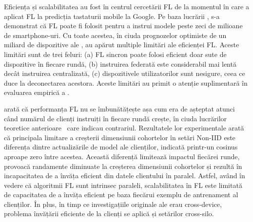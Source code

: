 Eficiența și scalabilitatea au fost în centrul cercetării FL de la momentul în care \citet{GoogleKeyboard} a aplicat FL la predicția tastaturii mobile la Google. Pe baza lucrării \citet{GoogleKeyboard}, \citet{ScaleSystemDesign} s-a demonstrat că FL poate fi folosit pentru a instrui modele peste zeci de milioane de smartphone-uri. Cu toate acestea, în ciuda prognozelor optimiste de un miliard de dispozitive ale \citet{ScaleSystemDesign}, au apărut multiple limitări ale eficienței FL. Aceste limitări sunt de trei feluri: (a) FL sincron poate folosi eficient doar sute de dispozitive în fiecare rundă, (b) instruirea federată este considerabil mai lentă decât instruirea centralizată, (c) dispozitivele utilizatorilor sunt nesigure, ceea ce duce la deconectarea acestora. Aceste limitări au primit o atenție suplimentară în evaluarea empirică a \citet{LargeCohorts}.

\citet{LargeCohorts} arată că performanța FL nu se îmbunătățește așa cum era de așteptat atunci când numărul de clienți instruiți în fiecare rundă crește, în ciuda lucrărilor teoretice anterioare~\citep{TighterTheory} care indicau contrariul. Rezultatele lor experimentale arată că principala limitare a creșterii dimensiunii cohortelor în setări Non-IID este diferența dintre actualizările de model ale clienților, indicată printr-un cosinus aproape zero între acestea. Această diferență limitează impactul fiecărei runde, provoacă randamente diminuate la creșterea dimensiunii cohortelor și rezultă în incapacitatea de a învăța eficient din datele clientului în paralel. Astfel, având în vedere că algoritmii FL sunt intrinsec paraleli, scalabilitatea în FL este limitată de capacitatea de a învăța eficient pe baza fiecărui exemplu de antrenament al clienților. În plus, în timp ce investigațiile originale ale \citet{ScaleSystemDesign,LargeCohorts} erau cross-device, problema învățării eficiente de la clienți se aplică și setărilor cross-silo.


